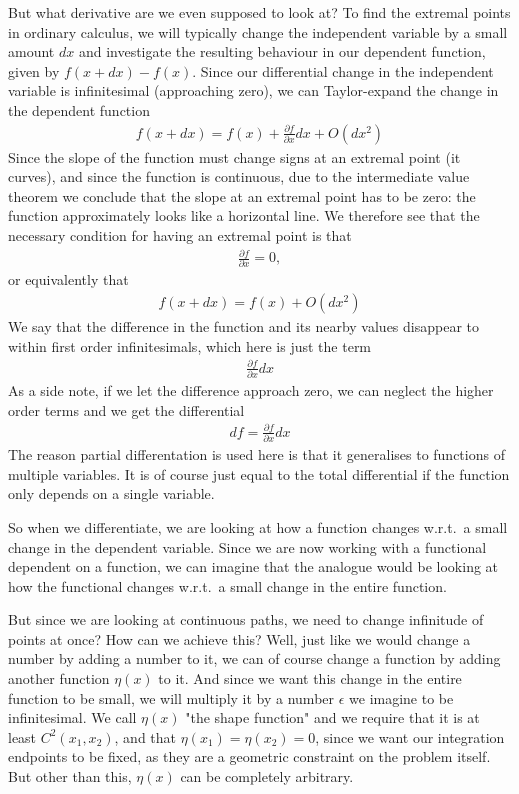 \documentclass[a4paper]{article}
\begin{document}
    But what derivative are we even supposed to look at? To find the extremal points in ordinary calculus, we will typically change the independent variable by a small amount \(dx\) and investigate the resulting behaviour in our dependent function, given by \(f(x + dx) - f(x)\). Since our differential change in the independent variable is infinitesimal (approaching zero), we can Taylor-expand the change in the dependent function \begin{align*}
        f(x + dx) = f(x) + \frac{\partial f}{\partial x}dx + O(dx^{2})
    \end{align*}
    Since the slope of the function must change signs at an extremal point (it curves), and since the function is continuous, due to the intermediate value theorem we conclude that the slope at an extremal point has to be zero: the function approximately looks like a horizontal line. We therefore see that the necessary condition for having an extremal point is that \begin{align*}
        \frac{\partial f}{\partial x} = 0,
    \end{align*}
    or equivalently that \begin{align*}
        f(x + dx) = f(x) + O(dx^{2})
    \end{align*}
    We say that the difference in the function and its nearby values disappear to within first order infinitesimals, which here is just the term \begin{align*}
        \frac{\partial f}{\partial x}dx
    \end{align*}
    As a side note, if we let the difference approach zero, we can neglect the higher order terms and we get the differential \begin{align*}
        df = \frac{\partial f}{\partial x}dx
    \end{align*}
    The reason partial differentation is used here is that it generalises to functions of multiple variables. It is of course just equal to the total differential if the function only depends on a single variable.

    So when we differentiate, we are looking at how a function changes w.r.t.\ a small change in the dependent variable. Since we are now working with a functional dependent on a function, we can imagine that the analogue would be looking at how the functional changes w.r.t.\ a small change in the entire function.
    
    But since we are looking at continuous paths, we need to change infinitude of points at once? How can we achieve this? Well, just like we would change a number by adding a number to it, we can of course change a function by adding another function \(\eta(x)\)  to it. And since we want this change in the entire function to be small, we will multiply it by a number \(\epsilon\) we imagine to be infinitesimal. We call \(\eta(x)\) "the shape function" and we require that it is at least \(C^2(x_1, x_2)\), and that \(\eta(x_1) = \eta(x_2) = 0\), since we want our integration endpoints to be fixed, as they are a geometric constraint on the problem itself. But other than this, \(\eta(x)\) can be completely arbitrary. 
\end{document}
